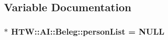 \subsection{Variable Documentation}
\hypertarget{namespace_h_t_w_1_1_a_i_1_1_beleg_a83e4fd1b9398faa1326da1af8261ee0a}{
\subsubsection[{person\-List}]{$\ast$ H\-T\-W\-::\-A\-I\-::\-Beleg\-::person\-List = N\-U\-L\-L}}\label{namespace_h_t_w_1_1_a_i_1_1_beleg_a83e4fd1b9398faa1326da1af8261ee0a}
